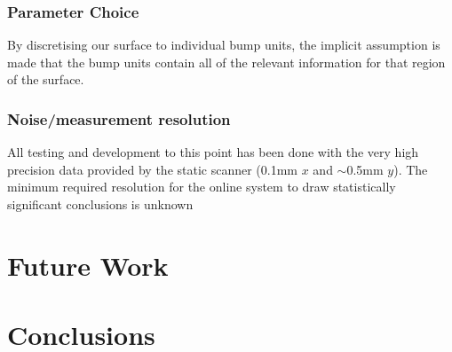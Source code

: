 \documentclass[12pt]{report}
\begin{document}
        \subsection{Parameter Choice}
            By discretising our surface to individual bump units, the implicit assumption is made that the bump units contain all of the relevant information for that region of the surface.
        \subsection{Noise/measurement resolution}
            All testing and development to this point has been done with the very high precision data provided by the static scanner (0.1mm $x$ and $\sim$0.5mm $y$). The minimum required resolution for the online system to draw statistically significant conclusions is unknown
\chapter{Future Work}
\chapter{Conclusions}



\end{document}
